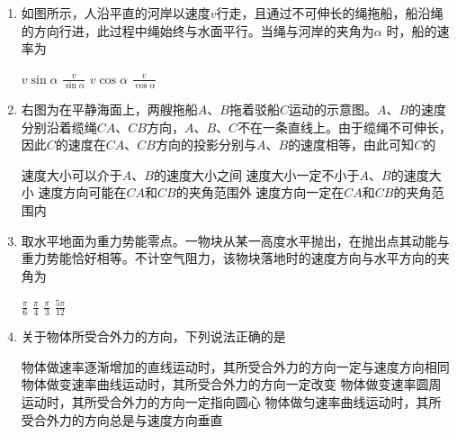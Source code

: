 \begin{enumerate}[leftmargin=0em]
\item 
{}
如图所示，人沿平直的河岸以速度$ v $行走，且通过不可伸长的绳拖船，船沿绳的方向行进，此过程中绳始终与水面平行。当绳与河岸的夹角为$ \alpha $ 时，船的速率为  
\begin{figure}[h!]
\centering

\end{figure}

\fourchoices
{$ v \sin \alpha $}
{$ \frac { v } { \sin \alpha } $}
{$ v \cos \alpha $}
{$ \frac { v } { \cos \alpha } $}


\item 
{}
右图为在平静海面上，两艘拖船$ A $、$ B $拖着驳船$ C $运动的示意图。$ A $、$ B $的速度分别沿着缆绳$ CA $、$ CB $方向，$ A $、$ B $、$ C $不在一条直线上。由于缆绳不可伸长，因此$ C $的速度在$ CA $、$ CB $方向的投影分别与$ A $、$ B $的速度相等，由此可知$ C $的  


\begin{minipage}[h!]{0.7\linewidth}
\vspace{0.3em}
\fourchoices
{速度大小可以介于$ A $、$ B $的速度大小之间}
{速度大小一定不小于$ A $、$ B $的速度大小}
{速度方向可能在$ CA $和$ CB $的夹角范围外}
{速度方向一定在$ CA $和$ CB $的夹角范围内}

\vspace{0.3em}
\end{minipage}
\hfill
\begin{minipage}[h!]{0.3\linewidth}
\flushright
\vspace{0.3em}

\vspace{0.3em}
\end{minipage}


\item 
{}
取水平地面为重力势能零点。一物块从某一高度水平抛出，在抛出点其动能与重力势能恰好相等。不计空气阻力，该物块落地时的速度方向与水平方向的夹角为  

\fourchoices
{$ \frac { \pi } { 6 } $}
{$ \frac { \pi } { 4 } $}
{$ \frac { \pi } { 3 } $}
{$ \frac { 5 \pi } { 12 } $}




\item 
{}
关于物体所受合外力的方向，下列说法正确的是  

\fourchoices
{物体做速率逐渐增加的直线运动时，其所受合外力的方向一定与速度方向相同}
{物体做变速率曲线运动时，其所受合外力的方向一定改变}
{物体做变速率圆周运动时，其所受合外力的方向一定指向圆心}
{物体做匀速率曲线运动时，其所受合外力的方向总是与速度方向垂直}



\end{enumerate}
